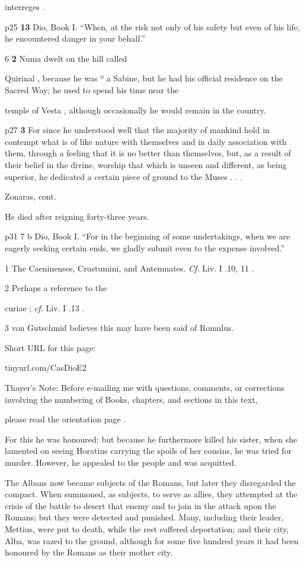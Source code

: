 interreges .

p25
\textbf{13}
Dio, Book I. ``When, at the risk not only of his safety but even of his life, he encountered danger in your behalf.''

6
\textbf{2} Numa dwelt on the hill called

Quirinal , because he was º a Sabine, but he had his official residence on the
Sacred Way; he used to spend his time near the

temple of Vesta , although occasionally he would remain in the country.

p27
\textbf{3} For since he understood well that the majority of mankind hold in contempt what is of like nature with themselves and in daily association with them, through a feeling that it is no better than themselves, but, as a result of their belief in the divine, worship that which is unseen and different, as being superior, he dedicated a certain piece of ground to the Muses . . .

Zonaras, cont.

He died after reigning forty-three years.

p31
7 b
Dio, Book I. ``For in the beginning of some undertakings, when we are eagerly seeking certain ends, we gladly submit even to the expense involved.''

1
The Caeninenses, Crustumini, and Antemnates. \emph{Cf.} Liv. I .10, 11 .



2
Perhaps a reference to the

curiae ; \emph{cf.} Liv. I .13 .



3
von Gutschmid believes this may have been said of Romulus.


Short URL for this page:

tinyurl.com/CasDioE2

Thayer's Note: Before e-mailing me with questions, comments, or corrections involving the numbering of Books, chapters, and sections in this text,

please read the orientation page .

For this he was honoured; but because he furthermore killed his sister, when she lamented on seeing Horatius carrying the spoils of her cousins, he was tried for murder. However, he appealed to the people and was acquitted.

The Albans now became subjects of the Romans, but later they disregarded the compact. When summoned, as subjects, to serve as allies, they attempted at the crisis of the battle to desert that enemy and to join in the attack upon the Romans; but they were detected and punished. Many, including their leader, Mettius, were put to death, while the rest suffered deportation; and their city, Alba, was razed to the ground, although for some five hundred years it had been honoured by the Romans as their mother city.

